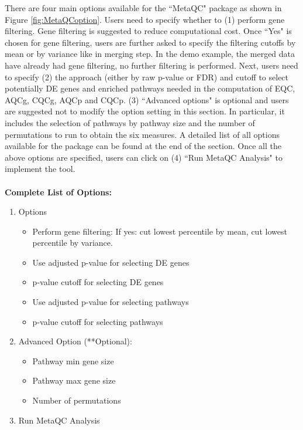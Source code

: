 There are four main options available for the ``MetaQC" package as shown in Figure \ref{fig:MetaQCoption}. Users need to specify whether to (1) perform gene filtering. Gene filtering is suggested to reduce computational cost. Once ``Yes" is chosen for gene filtering, users are further asked to specify the filtering cutoffs by mean or by variance like in merging step. In the demo example, the merged data have already had gene filtering, no further filtering is performed.   Next, users need to specify (2) the approach (either by raw p-value or FDR) and cutoff to select potentially DE genes and enriched pathways needed in the computation of EQC, AQCg, CQCg, AQCp and CQCp. (3) ``Advanced options" is optional and users are suggested not to modify the option setting in this section. In particular, it includes the selection of pathways by pathway size and the number of permutations to run to obtain the six measures. A detailed list of all options available for the package can be found at the end of the section. Once all the above options are specified, users can click on (4) ``Run MetaQC Analysis" to implement the tool. \\~\\

\textbf{Complete List of Options:} 

\begin{enumerate}
  \item Options
  \begin{itemize}
     \item Perform gene filtering: If yes: cut lowest percentile by mean, cut lowest percentile by variance. 
     \item Use adjusted p-value for selecting DE genes
     \item p-value cutoff for selecting DE genes
     \item Use adjusted p-value for selecting pathways
     \item p-value cutoff for selecting pathways
    \end{itemize}
   \item Advanced Option (**Optional): 
        \begin{itemize}
      \item Pathway min gene size
      \item Pathway max gene size
      \item Number of permutations
    \end{itemize} 
  \item Run MetaQC Analysis
\end{enumerate}
   

